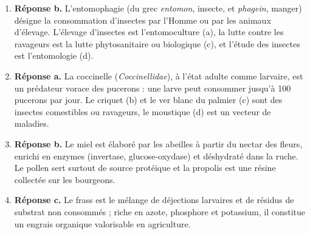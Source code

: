\documentclass[11pt]{article}
\newcommand{\cle}[1]{{\popxbold\color{popdark}#1}}
\begin{document}
\begin{corrige}
\begin{enumerate}
\item \textbf{Réponse b.} L'\cle{entomophagie} (du grec \emph{entomon}, insecte, et \emph{phagein}, manger) désigne la consommation d'insectes par l'Homme ou par les animaux d'élevage. L'élevage d'insectes est l'\cle{entomoculture} (a), la lutte contre les ravageurs est la lutte phytosanitaire ou biologique (c), et l'étude des insectes est l'\cle{entomologie} (d).
\item \textbf{Réponse a.} La coccinelle (\emph{Coccinellidae}), à l'état adulte comme larvaire, est un prédateur vorace des pucerons : une larve peut consommer jusqu'à \num{100} pucerons par jour. Le criquet (b) et le ver blanc du palmier (c) sont des insectes comestibles ou ravageurs, le moustique (d) est un vecteur de maladies.
\item \textbf{Réponse b.} Le miel est élaboré par les abeilles à partir du \cle{nectar} des fleurs, enrichi en enzymes (invertase, glucose-oxydase) et déshydraté dans la ruche. Le pollen sert surtout de source protéique et la propolis est une résine collectée sur les bourgeons.
\item \textbf{Réponse c.} Le \cle{frass} est le mélange de déjections larvaires et de résidus de substrat non consommés ; riche en azote, phosphore et potassium, il constitue un engrais organique valorisable en agriculture.
\end{enumerate}
\end{corrige}
\end{document}
